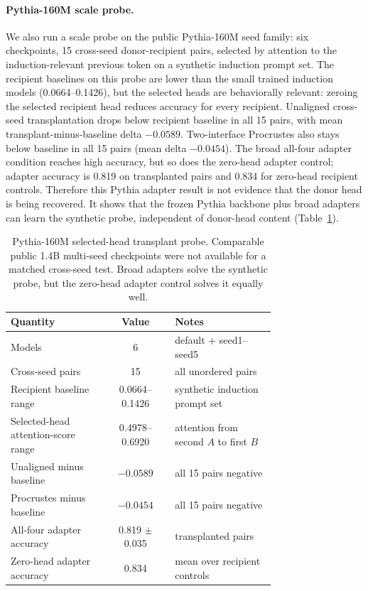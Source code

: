 \documentclass[final]{article}
\begin{document}
\paragraph{Pythia-160M scale probe.}
We also run a scale probe on the public Pythia-160M seed family:
six checkpoints, 15 cross-seed donor-recipient pairs, selected by attention to
the induction-relevant previous token on a synthetic induction prompt set. The
recipient baselines on this probe are lower than the small trained induction
models (0.0664--0.1426), but the selected heads are behaviorally relevant:
zeroing the selected recipient head reduces accuracy for every recipient.
Unaligned cross-seed transplantation drops below recipient baseline in all 15
pairs, with mean transplant-minus-baseline delta $-0.0589$. Two-interface
Procrustes also stays below baseline in all 15 pairs (mean delta $-0.0454$).
The broad all-four adapter condition reaches high accuracy, but so does the
zero-head adapter control; adapter accuracy is 0.819 on transplanted pairs and
0.834 for zero-head recipient controls. Therefore this Pythia adapter result is
not evidence that the donor head is being recovered. It shows that the frozen
Pythia backbone plus broad adapters can learn the synthetic probe, independent
of donor-head content (Table~\ref{tab:pythia160m}).

\begin{table}[h]
\centering
\small
\caption{Pythia-160M selected-head transplant probe. Comparable public 1.4B
multi-seed checkpoints were not available for a matched cross-seed test. Broad
adapters solve the synthetic probe, but the zero-head adapter control solves it
equally well.}
\label{tab:pythia160m}
\begin{tabular}{p{0.36\linewidth}cp{0.38\linewidth}}
\toprule
Quantity & Value & Notes \\
\midrule
Models & 6 & default + seed1--seed5 \\
Cross-seed pairs & 15 & all unordered pairs \\
Recipient baseline range & 0.0664--0.1426 & synthetic induction prompt set \\
Selected-head attention-score range & 0.4978--0.6920 & attention from second $A$ to first $B$ \\
Unaligned minus baseline & $-0.0589$ & all 15 pairs negative \\
Procrustes minus baseline & $-0.0454$ & all 15 pairs negative \\
All-four adapter accuracy & 0.819 $\pm$ 0.035 & transplanted pairs \\
Zero-head adapter accuracy & 0.834 & mean over recipient controls \\
\bottomrule
\end{tabular}
\end{table}
\end{document}
